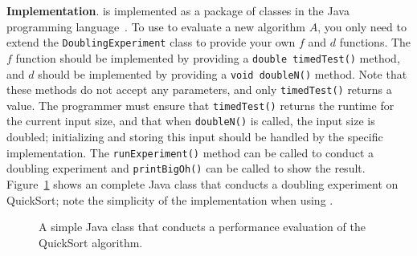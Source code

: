 
    {\bf Implementation}.  \toolname is implemented as a package of
    classes in the Java programming language~\cite{tool}.  To use \toolname to
    evaluate a new algorithm $A$, you only need to extend the
    \texttt{DoublingExperiment} class to provide your own $f$ and $d$
    functions.  The $f$ function should be implemented by providing a
    \texttt{double timedTest()} method, and $d$ should be implemented by
    providing a \texttt{void doubleN()} method. Note that these methods
    do not accept any parameters, and only \texttt{timedTest()} returns
    a value. The programmer must ensure that \texttt{timedTest()}
    returns the runtime for the current input size, and that when
    \texttt{doubleN()} is called, the input size is doubled;
    initializing and storing this input should be handled by the specific
    implementation. The \texttt{runExperiment()} method can be called to
    conduct a doubling experiment and \texttt{printBigOh()} can be
    called to show the result. Figure~\ref{fig:qsprogram} shows an
    complete Java class that conducts a doubling experiment on
    QuickSort; note the simplicity of the implementation when using
    \toolname.



    \begin{figure}[t]
    
    \vspace{-0.15in}
    \caption{A simple Java class that conducts a performance evaluation
    of the QuickSort algorithm.}\vspace{-0.20in}
    \label{fig:qsprogram}
    \end{figure}
